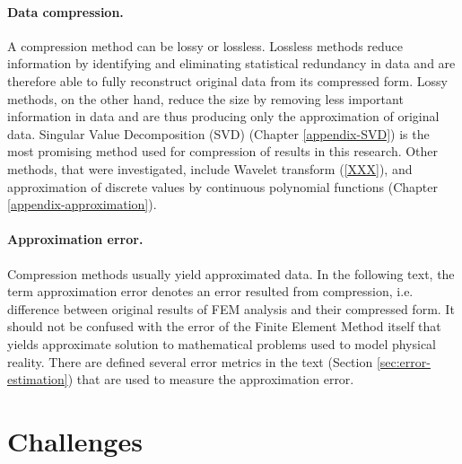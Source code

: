 \paragraph{Data compression.} A compression method can be lossy or lossless. Lossless methods reduce information by identifying and eliminating statistical redundancy in data and are therefore able to fully reconstruct original data from its compressed form. Lossy methods, on the other hand, reduce the size by removing less important information in data and are thus producing only the approximation of original data. Singular Value Decomposition (SVD) (Chapter \ref{appendix-SVD}) is the most promising method used for compression of results in this research. Other methods, that were investigated, include Wavelet transform (\ref{XXX}), and approximation of discrete values by continuous polynomial functions (Chapter \ref{appendix-approximation}).

\paragraph{Approximation error.} Compression methods usually yield approximated data. In the following text, the term approximation error denotes an error resulted from compression, i.e. difference between original results of FEM analysis and their compressed form. It should not be confused with the error of the Finite Element Method itself that yields approximate solution to mathematical problems used to model physical reality. There are defined several error metrics in the text (Section \ref{sec:error-estimation}) that are used to measure the approximation error.




\section{Challenges}



